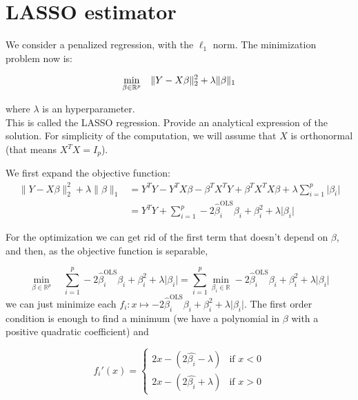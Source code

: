 \section{LASSO estimator}

\begin{tcolorbox}[width=\linewidth, sharp corners=all, colback=white!95!black]
We consider a penalized regression, with the $\ell_1$ norm. The minimization problem now is:

\begin{equation*}
\min_{\beta \in \mathbb{R}^p} \quad \lVert Y-X\beta \rVert_2^2 + \lambda \lVert \beta \rVert_1\\
\end{equation*}

where $\lambda$ is an hyperparameter.\\

This is called the LASSO regression. Provide an analytical expression of the solution. For simplicity of the computation, we will assume that $X$ is orthonormal (that means $X^TX = I_p$).
\end{tcolorbox}

We first expand the objective function:
\begin{equation*}
\begin{aligned}
    \lVert Y-X\beta \rVert_2^2 + \lambda \lVert \beta \rVert_1 &= Y^TY-Y^TX\beta-\beta^TX^TY+\beta^TX^TX\beta + \lambda \sum_{i=1}^p \lvert\beta_i\rvert\\
    &= Y^TY + \sum_{i=1}^p -2 \hat{\beta}_i^{\text{OLS}}\beta_i + \beta_i^2 + \lambda \lvert\beta_i\rvert
\end{aligned}
\end{equation*}

For the optimization we can get rid of the first term that doesn't depend on $\beta$, and then, as the objective function is separable,

$$\min_{\beta \in \mathbb{R}^p} \quad \sum_{i=1}^p -2 \hat{\beta}_i^{\text{OLS}}\beta_i + \beta_i^2 + \lambda\lvert\beta_i\rvert = \sum_{i=1}^p \min_{\beta_i \in \mathbb{R}} -2 \hat{\beta}_i^{\text{OLS}}\beta_i + \beta_i^2 + \lambda\lvert\beta_i\rvert$$
we can just minimize each $f_i \colon x \mapsto -2 \hat{\beta}_i^{\text{OLS}}\beta_i + \beta_i^2 + \lambda\lvert\beta_i\rvert.$
The first order condition is enough to find a minimum (we have a polynomial in $\beta$ with a positive quadratic coefficient) and

$$f_i'(x) = \left\{
    \begin{array}{ll}
        2x-(2\hat{\beta_i}-\lambda) & \mbox{if } x<0 \\
        2x-(2\hat{\beta_i}+\lambda) & \mbox{if } x>0
    \end{array}
\right.$$

